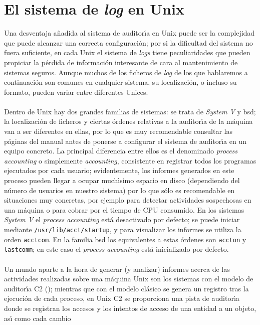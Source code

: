 \section{El sistema de {\it log} en Unix}
Una desventaja a\~nadida al sistema de auditor\'{\i}a en Unix puede ser la 
complejidad que puede alcanzar una correcta configuraci\'on; por si la 
dificultad del sistema no fuera suficiente, en cada Unix el sistema de {\it 
logs} tiene peculiaridades que pueden propiciar la p\'erdida de informaci\'on
interesante de cara al mantenimiento de sistemas seguros. Aunque muchos de los 
ficheros de {\it log} de los que hablaremos a continuaci\'on son comunes en
cualquier sistema, su localizaci\'on, o incluso su formato, pueden variar entre
diferentes Unices.\\
\\Dentro de Unix hay dos grandes familias de sistemas: se trata de {\it System
V} y {\sc bsd}; la localizaci\'on de ficheros y ciertas \'ordenes relativas
a la auditor\'{\i}a de la m\'aquina van a ser diferentes en ellas, por lo que
es muy recomendable consultar las p\'aginas del manual antes de ponerse a
configurar el sistema de auditor\'{\i}a en un equipo concreto. La principal 
diferencia entre ellos es el denominado {\it process accounting} o simplemente
{\it accounting}, consistente en registrar todos los programas ejecutados por 
cada usuario; evidentemente, los informes generados en este proceso pueden
llegar a ocupar much\'{\i}simo espacio en disco (dependiendo del n\'umero de
usuarios en nuestro sistema) por lo que s\'olo es recomendable en situaciones
muy concretas, por ejemplo para detectar actividades sospechosas en una 
m\'aquina o para cobrar por el tiempo de CPU consumido. En los sistemas {\it
System V} el {\it process accounting} est\'a desactivado por defecto; se
puede iniciar mediante {\tt /usr/lib/acct/startup}, y para visualizar los 
informes se utiliza la orden {\tt acctcom}. En la familia {\sc bsd} los
equivalentes a estas \'ordenes son {\tt accton} y {\tt lastcomm}; en este
caso el {\it process accounting} est\'a inicializado por defecto.\\
\\Un mundo aparte a la hora de generar (y analizar) informes acerca de las 
actividades realizadas sobre una m\'aquina Unix son los sistemas con el
modelo de auditor\'{\i}a C2 (\cite{kn:ora}); mientras que con el modelo 
cl\'asico se genera un registro tras la ejecuci\'on de cada proceso, en Unix 
C2 se proporciona una pista de auditor\'{\i}a donde se registran los accesos
y los intentos de acceso de una entidad a un objeto, as\'{\i} como cada cambio
